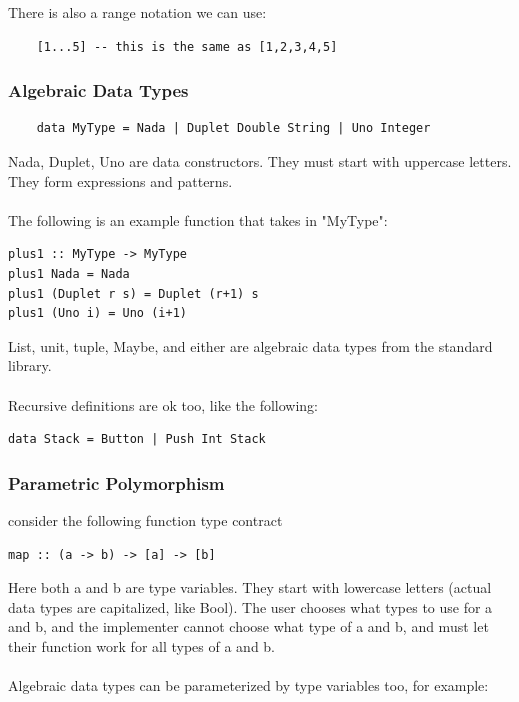 \documentclass[12pt]{article}
\begin{document}
There is also a range notation we can use:

\begin{lstlisting}
	[1...5] -- this is the same as [1,2,3,4,5]
\end{lstlisting}

\subsubsection{Algebraic Data Types}

\begin{lstlisting}
	data MyType = Nada | Duplet Double String | Uno Integer
\end{lstlisting}

Nada, Duplet, Uno are data constructors. They must start with uppercase letters. They form expressions and patterns.\\
\\
The following is an example function that takes in "MyType":

\begin{lstlisting}
plus1 :: MyType -> MyType
plus1 Nada = Nada
plus1 (Duplet r s) = Duplet (r+1) s
plus1 (Uno i) = Uno (i+1)
\end{lstlisting}

List, unit, tuple, Maybe, and either are algebraic data types from the standard library.\\
\\
Recursive definitions are ok too, like the following:

\begin{lstlisting}
data Stack = Button | Push Int Stack
\end{lstlisting}

\subsubsection{Parametric Polymorphism}

consider the following function type contract

\begin{lstlisting}
map :: (a -> b) -> [a] -> [b]
\end{lstlisting}

Here both a and b are type variables. They start with lowercase letters (actual data types are capitalized, like Bool). The user chooses what types to use for a and b, and the implementer cannot choose what type of a and b, and must let their function work for all types of a and b.\\
\\
Algebraic data types can be parameterized by type variables too, for example:
\end{document}
